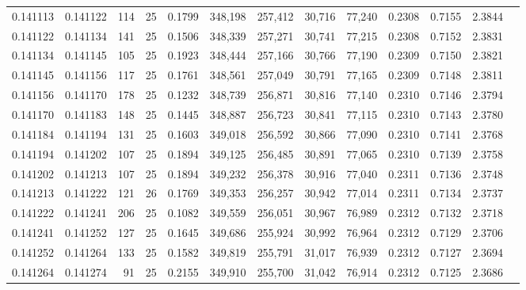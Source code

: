 \begin{tabular}{rrrrrrrrrrrrr}
0.141113 & 0.141122 &   114 &  25 &                                     0.1799 & 348,198 & 257,412 &  30,716 &  77,240 & 0.2308 & 0.7155 & 2.3844 \\
0.141122 & 0.141134 &   141 &  25 &                                     0.1506 & 348,339 & 257,271 &  30,741 &  77,215 & 0.2308 & 0.7152 & 2.3831 \\
0.141134 & 0.141145 &   105 &  25 &                                     0.1923 & 348,444 & 257,166 &  30,766 &  77,190 & 0.2309 & 0.7150 & 2.3821 \\
0.141145 & 0.141156 &   117 &  25 &                                     0.1761 & 348,561 & 257,049 &  30,791 &  77,165 & 0.2309 & 0.7148 & 2.3811 \\
0.141156 & 0.141170 &   178 &  25 &                                     0.1232 & 348,739 & 256,871 &  30,816 &  77,140 & 0.2310 & 0.7146 & 2.3794 \\
0.141170 & 0.141183 &   148 &  25 &                                     0.1445 & 348,887 & 256,723 &  30,841 &  77,115 & 0.2310 & 0.7143 & 2.3780 \\
0.141184 & 0.141194 &   131 &  25 &                                     0.1603 & 349,018 & 256,592 &  30,866 &  77,090 & 0.2310 & 0.7141 & 2.3768 \\
0.141194 & 0.141202 &   107 &  25 &                                     0.1894 & 349,125 & 256,485 &  30,891 &  77,065 & 0.2310 & 0.7139 & 2.3758 \\
0.141202 & 0.141213 &   107 &  25 &                                     0.1894 & 349,232 & 256,378 &  30,916 &  77,040 & 0.2311 & 0.7136 & 2.3748 \\
0.141213 & 0.141222 &   121 &  26 &                                     0.1769 & 349,353 & 256,257 &  30,942 &  77,014 & 0.2311 & 0.7134 & 2.3737 \\
0.141222 & 0.141241 &   206 &  25 &                                     0.1082 & 349,559 & 256,051 &  30,967 &  76,989 & 0.2312 & 0.7132 & 2.3718 \\
0.141241 & 0.141252 &   127 &  25 &                                     0.1645 & 349,686 & 255,924 &  30,992 &  76,964 & 0.2312 & 0.7129 & 2.3706 \\
0.141252 & 0.141264 &   133 &  25 &                                     0.1582 & 349,819 & 255,791 &  31,017 &  76,939 & 0.2312 & 0.7127 & 2.3694 \\
0.141264 & 0.141274 &    91 &  25 &                                     0.2155 & 349,910 & 255,700 &  31,042 &  76,914 & 0.2312 & 0.7125 & 2.3686 \\

\end{tabular}
